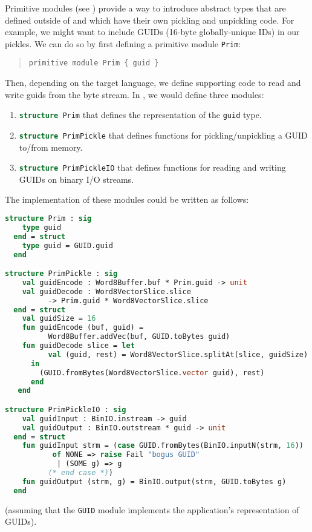 Primitive modules (see ) provide a way to introduce abstract
types that are defined outside
of \asdl{} and which have their own pickling and unpickling code.
For example, we might want to include GUIDs (16-byte globally-unique IDs) in our pickles.
We can do so by first defining a primitive module \lstinline!Prim!:
%
\begin{quote}\begin{lstlisting}[language=ASDL]
primitive module Prim { guid }
\end{lstlisting}\end{quote}%
%
Then, depending on the target language, we define
supporting code to read and write guids from the byte stream.
In \sml{}, we would define three modules:
\begin{enumerate}
  \item \lstinline[language=SML]!structure Prim! that defines the representation of the
    \lstinline[language=SML]!guid! type.
  \item
    \lstinline[language=SML]!structure PrimPickle! that defines functions for pickling/unpickling
    a GUID to/from memory.
  \item
    \lstinline[language=SML]!structure PrimPickleIO! that defines functions for reading
    and writing GUIDs on binary I/O streams.
\end{enumerate}%
The \sml{} implementation of these modules could be written as follows:
\begin{code}\begin{lstlisting}[language=SML]
structure Prim : sig
    type guid
  end = struct
    type guid = GUID.guid
  end

structure PrimPickle : sig
    val guidEncode : Word8Buffer.buf * Prim.guid -> unit
    val guidDecode : Word8VectorSlice.slice
          -> Prim.guid * Word8VectorSlice.slice
  end = struct
    val guidSize = 16
    fun guidEncode (buf, guid) =
          Word8Buffer.addVec(buf, GUID.toBytes guid)
    fun guidDecode slice = let
    	  val (guid, rest) = Word8VectorSlice.splitAt(slice, guidSize)
	  in
	    (GUID.fromBytes(Word8VectorSlice.vector guid), rest)
	  end
   end

structure PrimPickleIO : sig
    val guidInput : BinIO.instream -> guid
    val guidOutput : BinIO.outstream * guid -> unit
  end = struct
    fun guidInput strm = (case GUID.fromBytes(BinIO.inputN(strm, 16))
	       of NONE => raise Fail "bogus GUID"
	        | (SOME g) => g
	      (* end case *))
    fun guidOutput (strm, g) = BinIO.output(strm, GUID.toBytes g)
  end
\end{lstlisting}\end{code}%
(assuming that the \lstinline!GUID! module implements the application's representation
of GUIDs).

